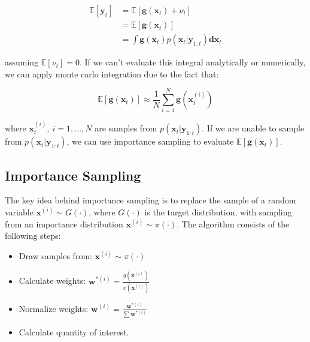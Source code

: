 \documentclass[
]{article}
\providecommand{\tightlist}{%
  \setlength{\itemsep}{0pt}\setlength{\parskip}{0pt}}
\begin{document}
\[
\begin{equation*}
    \begin{aligned}
        \mathbb{E}[\textbf{y}_t] &= \mathbb{E}[\textbf{g}(\textbf{x}_{t})+ \nu_t] \\
        &= \mathbb{E}[\textbf{g}(\textbf{x}_{t})] \\
        &= \int  \textbf{g}(\textbf{x}_{t}) p(\textbf{x}_{t}|\textbf{y}_{1:t}) \textbf{dx}_t
    \end{aligned}
\end{equation*}
\]

assuming \(\mathbb{E}[\nu_t] = 0\). If we can't evaluate this integral
analytically or numerically, we can apply monte carlo integration due to
the fact that:

\[
\begin{equation*} 
    \mathbb{E}[\textbf{g}(\textbf{x}_{t})] \approx \frac{1}{N} \sum_{i=1}^N \textbf{g}(\textbf{x}_{t}^{(i)})
\end{equation*}
\]

where \(\textbf{x}_{t}^{(i)},\ i = 1,...,N\) are samples from
\(p(\textbf{x}_{t}|\textbf{y}_{1:t})\). If we are unable to sample from
\(p(\textbf{x}_{t}|\textbf{y}_{1:t})\), we can use importance sampling
to evaluate \(\mathbb{E}[\textbf{g}(\textbf{x}_{t})]\).

\hypertarget{importance-sampling}{%
\subsection{Importance Sampling}\label{importance-sampling}}

The key idea behind importance sampling is to replace the sample of a
random variable \(\textbf{x}^{(i)} \sim G(\cdot)\), where \(G(\cdot)\)
is the target distribution, with sampling from an importance
distribution \(\textbf{x}^{(i)} \sim \pi(\cdot)\). The algorithm
consists of the following steps:

\begin{itemize}
\tightlist
\item
  Draw samples from: \(\textbf{x}^{(i)} \sim \pi(\cdot)\)
\item
  Calculate weights:
  \(\textbf{w}^{*(i)} = \frac{g(\textbf{x}^{(i)})}{\pi(\textbf{x}^{(i)})}\)
\item
  Normalize weights:
  \(\textbf{w}^{(i)} = \frac{\textbf{w}^{*(i)}}{\sum \textbf{w}^{*(i)}}\)
\item
  Calculate quantity of interest.
\end{itemize}
\end{document}
